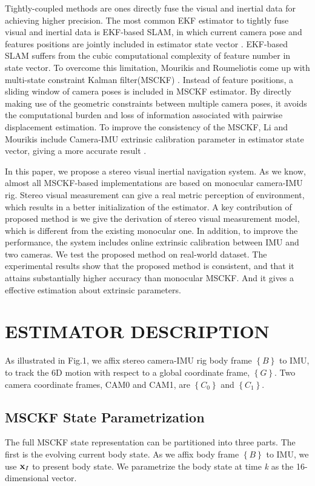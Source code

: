 \documentclass[a4paper, 10pt, conference]{ieeeconf}      %
\begin{document}
Tightly-coupled methods are ones directly fuse the visual and inertial data for achieving higher precision. The most common EKF estimator to tightly fuse visual and inertial data is EKF-based SLAM, in which current camera pose and features positions are jointly included in estimator state vector \cite{jones2011visual} . EKF-based SLAM suffers from the cubic computational complexity of feature number in state  vector. To overcome this limitation, Mourikis and Roumeliotis come up with multi-state constraint Kalman filter(MSCKF) \cite{mourikis2007multi}. Instead of feature positions, a sliding window of camera poses is included in MSCKF estimator. By directly making use of the geometric constraints between multiple camera poses, it avoids the computational burden and loss of information associated with pairwise displacement estimation. To improve the consistency of the MSCKF, Li and Mourikis include Camera-IMU extrinsic calibration parameter in estimator state vector, giving a more accurate result \cite{li2013high}. 

In this paper, we propose a stereo visual inertial navigation system. As we know, almost all MSCKF-based implementations are based on monocular camera-IMU rig. Stereo visual measurement can give a real metric perception of   environment, which results in a better initialization of the estimator. A key contribution of proposed method is we give the derivation of stereo visual measurement model, which is different from the existing monocular one. In addition, to improve the performance, the system includes online extrinsic calibration between IMU and two cameras. We test the proposed method on real-world dataset. The experimental results show that the proposed method is consistent, and that it attains substantially higher accuracy than monocular MSCKF. And it gives a effective estimation about extrinsic parameters.


\section{ESTIMATOR DESCRIPTION}

As illustrated in Fig.1, we affix stereo camera-IMU rig body frame $\left\lbrace B \right\rbrace$ to IMU, to track the 6D motion with respect to a global coordinate frame, $\left\lbrace G \right\rbrace$.  Two camera coordinate frames, CAM0 and CAM1, are $\left\lbrace C_0 \right\rbrace$ and $\left\lbrace C_1 \right\rbrace$.




\subsection{MSCKF State Parametrization}
The full MSCKF state representation can be partitioned into three parts. The first is the evolving current body state. As we affix body frame $\left\lbrace B \right\rbrace$ to IMU, we use $ \textbf x_{I}  $ to present body state. We parametrize the body state at time \emph k as the 16-dimensional vector.
\end{document}
